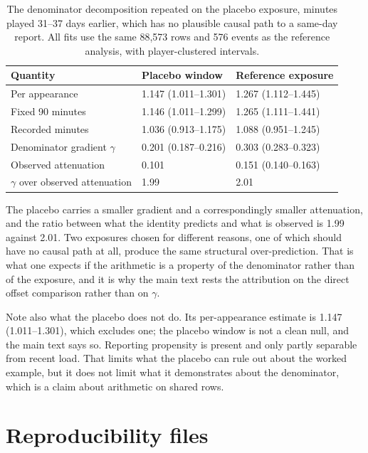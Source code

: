 \documentclass[11pt]{article}
\begin{document}
\begin{table}[h]
\centering
\caption{The denominator decomposition repeated on the placebo exposure, minutes played 31--37 days earlier, which has no plausible causal path to a same-day report. All fits use the same 88,573 rows and 576 events as the reference analysis, with player-clustered intervals.}
\label{tab:supp_placebo_denominator}
\small
\begin{tabular}{lll}
\toprule
Quantity & Placebo window & Reference exposure\\
\midrule
Per appearance & 1.147 (1.011--1.301) & 1.267 (1.112--1.445)\\
Fixed 90 minutes & 1.146 (1.011--1.299) & 1.265 (1.111--1.441)\\
Recorded minutes & 1.036 (0.913--1.175) & 1.088 (0.951--1.245)\\
Denominator gradient $\gamma$ & 0.201 (0.187--0.216) & 0.303 (0.283--0.323)\\
Observed attenuation & 0.101 & 0.151 (0.140--0.163)\\
$\gamma$ over observed attenuation & 1.99 & 2.01\\
\bottomrule
\end{tabular}
\end{table}

The placebo carries a smaller gradient and a correspondingly smaller attenuation, and the ratio between what the identity predicts and what is observed is 1.99 against 2.01. Two exposures chosen for different reasons, one of which should have no causal path at all, produce the same structural over-prediction. That is what one expects if the arithmetic is a property of the denominator rather than of the exposure, and it is why the main text rests the attribution on the direct offset comparison rather than on $\gamma$.

Note also what the placebo does not do. Its per-appearance estimate is 1.147 (1.011--1.301), which excludes one; the placebo window is not a clean null, and the main text says so. Reporting propensity is present and only partly separable from recent load. That limits what the placebo can rule out about the worked example, but it does not limit what it demonstrates about the denominator, which is a claim about arithmetic on shared rows.

\section{Reproducibility files}
\end{document}
